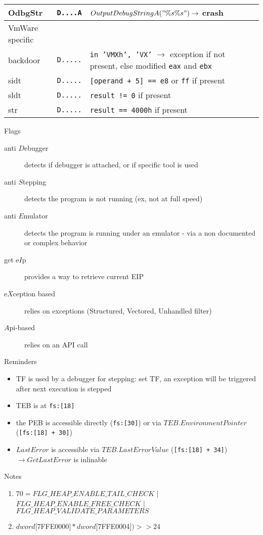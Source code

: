 \begin{tabular}{lllll}
OdbgStr			& {\tt D....A} & $OutputDebugStringA("\%s\%s") \rightarrow$ crash \\ 
\midrule
VmWare specific \\
\midrule
backdoor			& {\tt D.....} & {\tt in 'VMXh', 'VX'} $\rightarrow$ exception if not present, else modified {\tt eax} and {\tt ebx} \\
sidt				& {\tt D.....} & {\tt [operand + 5] == e8} or {\tt ff} if present \\
sldt				& {\tt D.....} & {\tt result != 0} if present \\
str				& {\tt D.....} & {\tt result == 4000h} if present \\
\bottomrule
\end{tabular}

\sig

\newpage

{\large Flags}
\begin{description}
\item[anti $D$ebugger]
detects if debugger is attached, or if specific tool is used
\item[anti $S$tepping]
detects the program is not running (ex, not at full speed)
\item[anti $E$mulator]
detects the program is running under an emulator - via a non documented or complex behavior
\item[get e$I$p]
provides a way to retrieve current EIP
\item[e$X$ception based]
relies on exceptions (Structured, Vectored, Unhandled filter)
\item[$A$pi-based]
relies on an API call
\end{description}


{\large Reminders}
\begin{itemize}
\item
TF is used by a debugger for stepping: set TF, an exception will be triggered after next execution is stepped
\item
TEB is at {\tt fs:[18]}
\item
the PEB is accessible directly ({\tt fs:[30]}) or via $TEB.EnvironmentPointer$ ({\tt [fs:[18] + 30]})
\item
$LastError$ is accessible via $TEB.LastErrorValue$ ({\tt [fs:[18] + 34]}) $\rightarrow GetLastError$ is inlinable
\end{itemize}
{\large Notes}
\begin{enumerate}
\item
$70 = ${\footnotesize $FLG\_HEAP\_ENABLE\_TAIL\_CHECK$} $|$ {\footnotesize $FLG\_HEAP\_ENABLE\_FREE\_CHECK$} $|$ {\footnotesize  $FLG\_HEAP\_VALIDATE\_PARAMETERS$}
\item
$dword [$7FFE0000$] * dword[$7FFE0004$]) >> 24$
\end{enumerate}
\sig

